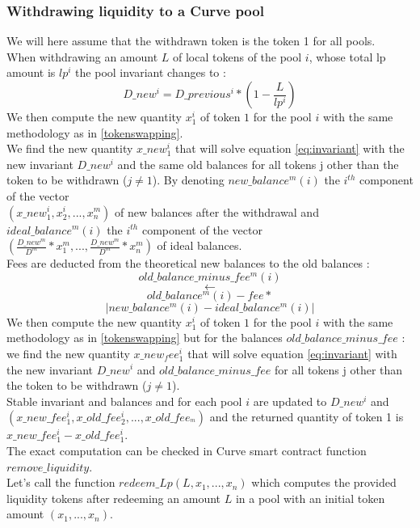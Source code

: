 \documentclass[conference]{IEEEtran}
\begin{document}
\subsubsection{Withdrawing liquidity to a Curve pool}\label{withdraw}
We will here assume that the withdrawn token is the token 1 for all pools.\\
When withdrawing an amount $L$ of local tokens of the pool $i$, whose total lp amount is $lp^i$ the pool invariant changes to :
\begin{equation}
    D\_new^i = D\_previous^i*(1-\frac{L}{lp^i})  
\end{equation}
We then compute the new quantity $x_1^i$ of token $1$ for the pool $i$ with the same methodology as in \ref{tokenswapping}.\\
We find the new quantity $x\_new_1^i$ that will solve equation \ref{eq:invariant} with the new invariant $D\_new^i$ and the same old balances for all tokens j other than the token to be withdrawn ($j\neq 1$).
By denoting $new\_balance^m(i)$ the $i^{th}$ component of the vector\\
$(x\_new_1^i,x_2^i,...,x_n^m)$ of new balances after the withdrawal and  $ideal\_balance^m(i)$ the $i^{th}$ component of the vector\\ 
$(\frac{D\_new^m}{D^m} *x_1^m,..., \frac{D\_new^m}{D^m} *x_n^m)$ of ideal balances.\\
Fees are deducted from the theoretical new balances to the old balances :
\begin{equation}
old\_balance\_minus\_fee^m(i) 
\end{equation}
$$
\leftarrow
$$
$$
old\_balance^m(i) - fee*
$$
$$
\lvert new\_balance^m(i) -ideal\_balance^m(i)\rvert   
$$
We then compute the new quantity $x_1^i$ of token $1$ for the pool $i$ with the same methodology as in \ref{tokenswapping} but for the balances $old\_balance\_minus\_fee$ : we find the new quantity $x\_new_fee_1^i$ that will solve equation \ref{eq:invariant} with the new invariant $D\_new^i$ and $old\_balance\_minus\_fee$ for all tokens j other than the token to be withdrawn ($j\neq 1$).\\

Stable invariant and balances and for each pool $i$ are updated to $D\_new^i$ and\\$(x\_new\_fee_1^i,x\_old\_fee_2^i,...,x\_old\_fee_^m)$
and the returned quantity of token 1 is $x\_new\_fee_1^i - x\_old\_fee_1^i$.\\
The exact computation can be checked in Curve smart contract function $remove\_liquidity$.\\
Let's call the function $redeem\_Lp(L, x_1, ...,x_n)$ which computes the provided liquidity tokens after redeeming an amount $L$ in a pool with an initial token amount $(x_1, ...,x_n)$.\\
\end{document}
